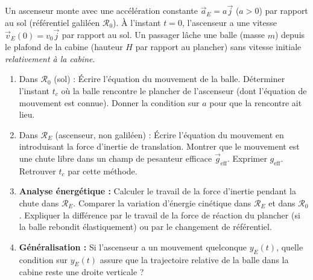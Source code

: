 \documentclass[11pt]{article}
\begin{document}
\begin{exercice}
Un ascenseur monte avec une accélération constante $\vec{a}_E = a\vec{j}$ ($a>0$) par rapport au sol (référentiel galiléen $\mathcal{R}_0$). À l'instant $t=0$, l'ascenseur a une vitesse $\vec{v}_E(0) = v_0\vec{j}$ par rapport au sol. Un passager lâche une balle (masse $m$) depuis le plafond de la cabine (hauteur $H$ par rapport au plancher) sans vitesse initiale \textit{relativement à la cabine}.
\begin{enumerate}
    \item Dans $\mathcal{R}_0$ (sol) : Écrire l'équation du mouvement de la balle. Déterminer l'instant $t_c$ où la balle rencontre le plancher de l'ascenseur (dont l'équation de mouvement est connue). Donner la condition sur $a$ pour que la rencontre ait lieu.
    \item Dans $\mathcal{R}_E$ (ascenseur, non galiléen) : Écrire l'équation du mouvement en introduisant la force d'inertie de translation. Montrer que le mouvement est une chute libre dans un champ de pesanteur efficace $\vec{g}_{\text{eff}}$. Exprimer $g_{\text{eff}}$. Retrouver $t_c$ par cette méthode.
    \item \textbf{Analyse énergétique :} Calculer le travail de la force d'inertie pendant la chute dans $\mathcal{R}_E$. Comparer la variation d'énergie cinétique dans $\mathcal{R}_E$ et dans $\mathcal{R}_0$. Expliquer la différence par le travail de la force de réaction du plancher (si la balle rebondit élastiquement) ou par le changement de référentiel.
    \item \textbf{Généralisation :} Si l'ascenseur a un mouvement quelconque $y_E(t)$, quelle condition sur $y_E(t)$ assure que la trajectoire relative de la balle dans la cabine reste une droite verticale ?
\end{enumerate}
\end{exercice}
\end{document}
